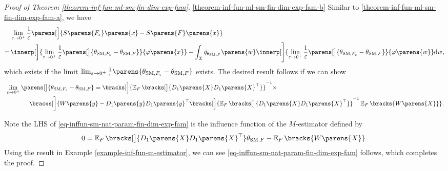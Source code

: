 \begin{proof}[Proof of Theorem \ref{theorem-inf-fun-ml-sm-fin-dim-exp-fam}]
	\ref{theorem-inf-fun-ml-sm-fin-dim-exp-fam-b}  Similar to \ref{theorem-inf-fun-ml-sm-fin-dim-exp-fam-a}, we have 
	\begin{align*}
		& \, \lim_{\varepsilon \to 0^+} \frac{1}{\varepsilon} \parens[\Big]{S \parens{ F_{\varepsilon}} \parens{x} - S \parens{F} \parens{x}} \\ 
		= & \, \innerp[\bigg]{ \lim_{\varepsilon \to 0^+} \frac{1}{\varepsilon} \parens[\big]{\theta_{\SM, F_{\varepsilon}} - \theta_{\SM, F} } }{ \varphi \parens{x}} - \int_{\calX} \tilde{q}_{\theta_{\SM, F}} \parens{w} \innerp[\Bigg]{ \lim_{\varepsilon \to 0^+} \frac{1}{\varepsilon} \parens[\big]{\theta_{\SM, F_{\varepsilon}} - \theta_{\SM, F} } }{ \varphi \parens{w} } \diff w, 
	\end{align*}
	which exists if the limit $\lim_{\varepsilon \to 0^+} \frac{1}{\varepsilon} \parens{\theta_{\SM, F_{\varepsilon}} - \theta_{\SM, F} }$ exists. The desired result follows if we can show 
	\begin{align}
		& \, \lim_{\varepsilon \to 0^+} \parens[\big]{\theta_{\SM, F_{\varepsilon}} - \theta_{\SM, F}} = \bracks[\Big]{\E_F \bracks[\big]{D_1 \parens{X} D_1 \parens{X}^\top} }^{-1} \times \nonumber \\ 
		& \qquad \qquad \braces[\bigg]{W \parens{y} - D_1 \parens{y} D_1 \parens{y}^\top \bracks[\Big]{\E_F \bracks[\big]{D_1 \parens{X} D_1 \parens{X}^\top} }^{-1} \E_F \bracks{W \parens{X}} }. \label{eq-inffun-sm-nat-param-fin-dim-exp-fam}
	\end{align}
	
	Note the LHS of \eqref{eq-inffun-sm-nat-param-fin-dim-exp-fam} is the influence function of the $M$-estimator defined by 
	\begin{align*}
		0 = \E_F \bracks[\big]{D_1 \parens{X} D_1 \parens{X}^\top} \theta_{\SM, F} - \E_F \bracks{W \parens{X}}. 
	\end{align*}
	Using the result in Example \ref{example-inf-fun-m-estimator}, we can see \eqref{eq-inffun-sm-nat-param-fin-dim-exp-fam} follows, which completes the proof. 
	

\end{proof}
